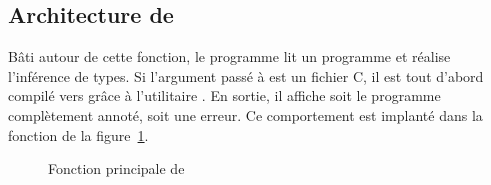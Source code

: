 \subsection*{Architecture de \ptrtype}

Bâti autour de cette fonction, le programme \ptrtype lit un programme \newspeak
et réalise l'inférence de types. Si l'argument passé à \ptrtype{} est un fichier
C, il est tout d'abord compilé vers \newspeak grâce à l'utilitaire \ctonewspeak.
En sortie, il affiche soit le programme complètement annoté, soit une erreur. Ce
comportement est implanté dans la fonction de la figure~\ref{fig:implem-process}.

\begin{figure}
\caption{Fonction principale de \ptrtype{}}
\label{fig:implem-process}
\end{figure}

